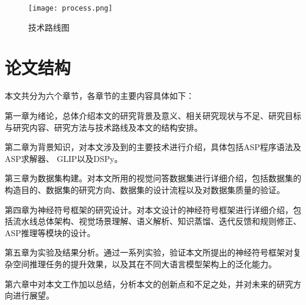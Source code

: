 \begin{figure}
    \centering
    \texttt{[image: process.png]}
    \caption{技术路线图\label{roadmap}}
\end{figure}

\section{论文结构}
本文共分为六个章节，各章节的主要内容具体如下：

第一章为绪论，总体介绍本文的研究背景及意义、相关研究现状与不足、研究目标
与研究内容、研究方法与技术路线及本文的结构安排。

第二章为背景知识，对本文涉及到的主要技术进行介绍，具体包括ASP程序语法及ASP求解器、
GLIP以及DSPy。

第三章为数据集构建。对本文所用的视觉问答数据集进行详细介绍，包括数据集的构造目的、数据集的研究方向、数据集的设计流程以及对数据集质量的验证。

第四章为神经符号框架的研究设计。对本文设计的神经符号框架进行详细介绍，包括流水线总体架构、视觉场景理解、语义解析、知识蒸馏、迭代反馈和规则修正、ASP推理等模块的设计。

第五章为实验及结果分析。通过一系列实验，验证本文所提出的神经符号框架对复杂空间推理任务的提升效果，以及其在不同大语言模型架构上的泛化能力。

第六章中对本文工作加以总结，分析本文的创新点和不足之处，并对未来的研究方向进行展望。
